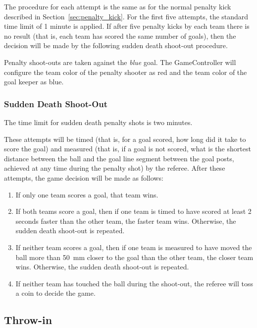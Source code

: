 \documentclass[12pt]{article}
\begin{document}
The procedure for each attempt is the same as for the normal penalty kick described in Section~\ref{sec:penalty_kick}. For the first five attempts, the standard time limit of 1 minute is applied. If after five penalty kicks by each team there is no result (that is, each team has scored the same number of goals), then the decision will be made by the following sudden death shoot-out procedure.

Penalty shoot-outs are taken against the \emph{blue} goal. The GameController will configure the team color of the penalty shooter as red and the team color of the goal keeper as blue.

\subsubsection{Sudden Death Shoot-Out}

The time limit for sudden death penalty shots is two minutes.

These attempts will be timed (that is, for a goal scored, how long did it take to score the goal) and measured (that is, if a goal is not scored, what is the shortest distance between the ball and the goal line segment between the goal posts, achieved at any time during the penalty shot) by the referee. After these attempts, the game decision will be made as follows:

\begin{enumerate}

\item If only one team scores a goal, that team wins.

\item If both teams score a goal, then if one team is timed to have scored at least 2 seconds faster than the other team, the faster team wins. Otherwise, the sudden death shoot-out is repeated.

\item If neither team scores a goal, then if one team is measured to have moved the ball more than 50~mm closer to the goal than the other team, the closer team wins. Otherwise, the sudden death shoot-out is repeated.

\item If neither team has touched the ball during the shoot-out, the referee will toss a coin to decide the game.

\end{enumerate}

\subsection{Throw-in}\label{sec:throw_in}
\end{document}
